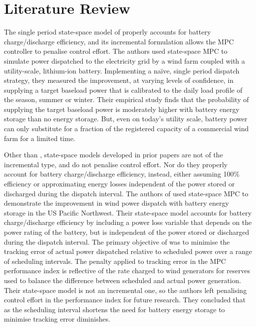 \documentclass[a4paper, 10pt, twocolumn, preprint, 3p]{elsarticle}
\begin{document}
\section{Literature Review}\label{sect:lit_review}
The single period state-space model of \cite{TREB16} properly accounts for battery charge/discharge efficiency, and its incremental formulation allows the MPC controller to penalise control effort.  The authors used state-space MPC to simulate power dispatched to the electricity grid by a wind farm coupled with a utility-scale, lithium-ion battery.  Implementing a na\"ive, single period dispatch strategy, they measured the improvement, at varying levels of confidence, in supplying a target baseload power that is calibrated to the daily load profile of the season, summer or winter.  Their empirical study finds that the probability of supplying the target baseload power is moderately higher with battery energy storage than no energy storage.  But, even on today's utility scale, battery power can only substitute for a fraction of the registered capacity of a commercial wind farm for a limited time.

Other than \cite{TREB16}, state-space models developed in prior papers are not of the incremental type, and do not penalise control effort.  Nor do they properly account for battery charge/discharge efficiency, instead, either assuming 100\% efficiency or approximating energy losses independent of the power stored or discharged during the dispatch interval.  The authors of \cite{HALBB14} used state-space MPC to demonstrate the improvement in wind power dispatch with battery energy storage in the US Pacific Northwest.  Their state-space model accounts for battery charge/discharge efficiency by including a power loss variable that depends on the power rating of the battery, but is independent of the power stored or discharged during the dispatch interval.  The primary objective of \cite{HALBB14} was to minimise the tracking error of actual power dispatched relative to scheduled power over a range of scheduling intervals.  The penalty applied to tracking error in the MPC performance index is reflective of the rate charged to wind generators for reserves used to balance the difference between scheduled and actual power generation.  Their state-space model is not an incremental one, so the authors left penalising control effort in the performance index for future research.  They concluded that as the scheduling interval shortens the need for battery energy storage to minimise tracking error diminishes.
\end{document}

